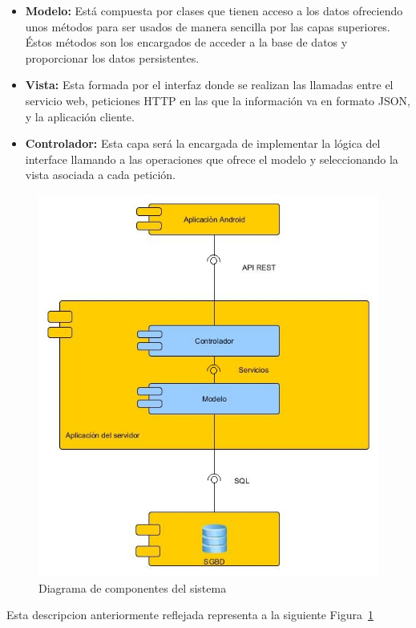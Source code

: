 \begin{itemize}
\item \textbf{Modelo:}
Está compuesta por clases que tienen acceso a los datos ofreciendo unos métodos para ser usados de manera sencilla por las capas superiores. Éstos métodos son los encargados de acceder a la base de datos y proporcionar los datos persistentes.
\item \textbf{Vista:}
Esta formada por el interfaz donde se realizan las llamadas entre el servicio web, peticiones HTTP en las que la información va en formato JSON, y la aplicación cliente.
\item \textbf{Controlador:}
Esta capa será la encargada de implementar la lógica del interface llamando a las operaciones que ofrece el modelo y seleccionando la vista asociada a cada petición.
\end{itemize}
\begin{figure}
		\centering
		\includegraphics[width=\textwidth] {componentes.jpg}
		\caption{Diagrama de componentes del sistema }\label{fig:componentes}
	\end{figure}
 Esta descripcion anteriormente reflejada representa a la siguiente Figura~\ref{fig:componentes}
